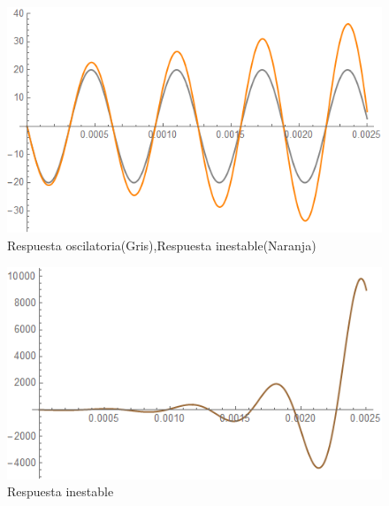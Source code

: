\documentclass[10pt,a4paper]{article} %
\begin{document}
\begin{figure}[H]	
	\begin{center}
		\includegraphics[scale=0.5]{respuestatemporal2}
	\end{center}
\caption{Respuesta oscilatoria(Gris),Respuesta inestable(Naranja)}
\end{figure}
\begin{figure}[H]
\begin{center}
		\includegraphics[scale=0.5]{respuestatemporal3}
\end{center}
	\caption{Respuesta inestable}
\end{figure} 
	
\end{document}
